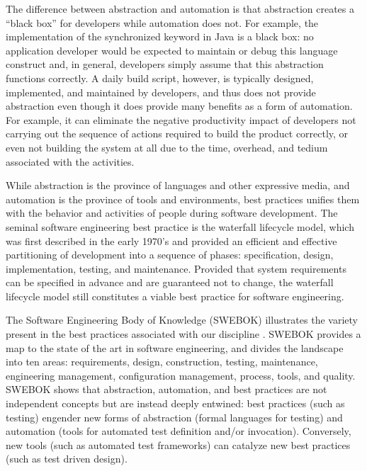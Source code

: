 The difference between abstraction and automation is that abstraction
creates a ``black box'' for developers while automation does not. For
example, the implementation of the synchronized keyword in Java is a black
box: no application developer would be expected to maintain or debug this
language construct and, in general, developers simply assume that this
abstraction functions correctly.  A daily build script, however, is
typically designed, implemented, and maintained by developers, and thus
does not provide abstraction even though it does provide many benefits as a
form of automation. For example, it can eliminate the negative productivity
impact of developers not carrying out the sequence of actions required to
build the product correctly, or even not building the system at all due to
the time, overhead, and tedium associated with the activities.

While abstraction is the province of languages and other expressive media,
and automation is the province of tools and environments, best practices
unifies them with the behavior and activities of people during software development.
The seminal software engineering best practice is the waterfall lifecycle
model, which was first described in the early 1970's and provided an
efficient and effective partitioning of development into a sequence of
phases: specification, design, implementation, testing, and maintenance.
Provided that system requirements can be specified in advance and are
guaranteed not to change, the waterfall lifecycle model still constitutes a
viable best practice for software engineering.

The Software Engineering Body of Knowledge (SWEBOK) illustrates the variety
present in the best practices associated with our discipline
\cite{Abran05}.  SWEBOK provides a map to the state of the art in software
engineering, and divides the landscape into ten areas: requirements,
design, construction, testing, maintenance, engineering management,
configuration management, process, tools, and quality.  SWEBOK shows that
abstraction, automation, and best practices are not independent concepts
but are instead deeply entwined: best practices (such as testing) engender
new forms of abstraction (formal languages for testing) and automation
(tools for automated test definition and/or invocation). Conversely, new
tools (such as automated test frameworks) can catalyze new best practices
(such as test driven design).

